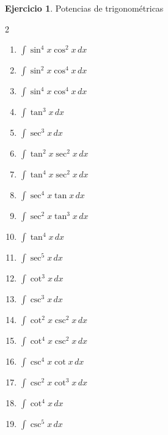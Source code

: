 \documentclass[12pt]{article}
\theoremstyle{definition}
\newtheorem{Ejer}[teorema]{Ejercicio}
\theoremstyle{remark}
\begin{document}
\begin{Ejer}{Potencias de trigonométricas}
\begin{multicols}{2}
\begin{enumerate}[resume=integrales]
\item $\displaystyle \int \sin^4 x\cos^2 x\,dx$
\item $\displaystyle \int \sin^2 x\cos^4 x\,dx$
\item $\displaystyle \int \sin^4 x\cos^4 x\,dx$
\item $\displaystyle \int \tan^3x\,dx$
\item $\displaystyle \int \sec^3x\,dx$
\item $\displaystyle \int \tan^2x\sec^2x\,dx$
\item $\displaystyle \int \tan^4x\sec^2x\,dx$
\item $\displaystyle \int \sec^4x\tan x\,dx$
\item $\displaystyle \int \sec^2x\tan^3x\,dx$
\item $\displaystyle \int \tan^4x\,dx$
\item $\displaystyle \int \sec^5x\,dx$
\item $\displaystyle \int \cot^3x\,dx$
\item $\displaystyle \int \csc^3x\,dx$
\item $\displaystyle \int \cot^2x\csc^2x\,dx$
\item $\displaystyle \int \cot^4x\csc^2x\,dx$
\item $\displaystyle \int \csc^4x\cot x\,dx$
\item $\displaystyle \int \csc^2x\cot^3x\,dx$
\item $\displaystyle \int \cot^4x\,dx$
\item $\displaystyle \int \csc^5x\,dx$
\end{enumerate}
\end{multicols}
\end{Ejer}
\end{document}
